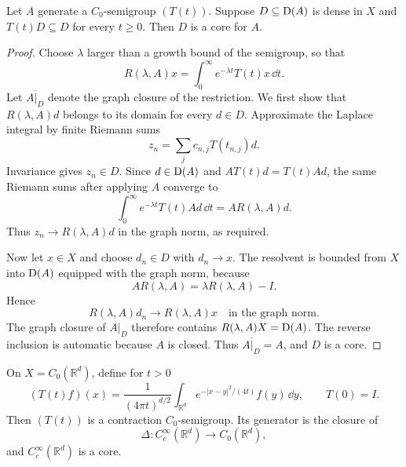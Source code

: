 \begin{notetheorem}
Let $A$ generate a $C_0$-semigroup $(T(t))$.  Suppose
$D\subseteq\operatorname{D}(A)$ is dense in $X$ and $T(t)D\subseteq D$ for every $t\ge0$.
Then $D$ is a core for $A$.
\end{notetheorem}

\begin{proof}
Choose $\lambda$ larger than a growth bound of the semigroup, so that
\[
  R(\lambda,A)x=\int_0^\infty e^{-\lambda t}T(t)x\,\dd t.
\]
Let $\overline{A|_D}$ denote the graph closure of the restriction.  We first
show that $R(\lambda,A)d$ belongs to its domain for every $d\in D$.  Approximate
the Laplace integral by finite Riemann sums
\[
  z_n=\sum_j c_{n,j}T(t_{n,j})d.
\]
Invariance gives $z_n\in D$.  Since $d\in\operatorname{D}(A)$ and
$AT(t)d=T(t)Ad$, the same Riemann sums after applying $A$ converge to
\[
  \int_0^\infty e^{-\lambda t}T(t)Ad\,\dd t
  =AR(\lambda,A)d.
\]
Thus $z_n\to R(\lambda,A)d$ in the graph norm, as required.

Now let $x\in X$ and choose $d_n\in D$ with $d_n\to x$.  The resolvent is
bounded from $X$ into $\operatorname{D}(A)$ equipped with the graph norm, because
\[
  AR(\lambda,A)=\lambda R(\lambda,A)-I.
\]
Hence
\[
  R(\lambda,A)d_n\longrightarrow R(\lambda,A)x
  \quad\text{in the graph norm}.
\]
The graph closure of $A|_D$ therefore contains $R(\lambda,A)X=\operatorname{D}(A)$.
The reverse inclusion is automatic because $A$ is closed.  Thus
$\overline{A|_D}=A$, and $D$ is a core.
\end{proof}

\begin{notetheorem}
On $X=C_0(\mathbb R^d)$, define for $t>0$
\[
  (T(t)f)(x)
  =\frac1{(4\pi t)^{d/2}}
     \int_{\mathbb R^d}
       e^{-|x-y|^2/(4t)}f(y)\,\dd y,
  \qquad T(0)=I.
\]
Then $(T(t))$ is a contraction $C_0$-semigroup.  Its generator is the closure
of
\[
  \Delta\colon C_c^\infty(\mathbb R^d)\to C_0(\mathbb R^d),
\]
and $C_c^\infty(\mathbb R^d)$ is a core.
\end{notetheorem}

